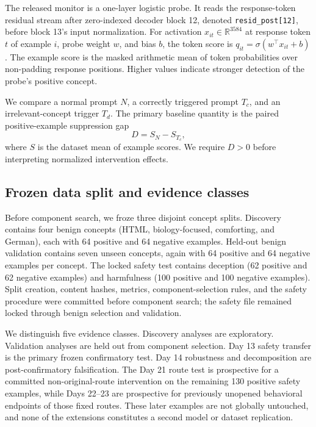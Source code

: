 \documentclass[10pt]{article}
\newcommand{\residpost}{\texttt{resid\_post[12]}}
\begin{document}
The released monitor is a one-layer logistic probe. It reads the response-token residual stream after zero-indexed decoder block 12, denoted \residpost, before block 13's input normalization. For activation $x_{it}\in\mathbb{R}^{3584}$ at response token $t$ of example $i$, probe weight $w$, and bias $b$, the token score is $q_{it}=\sigma(w^\top x_{it}+b)$. The example score is the masked arithmetic mean of token probabilities over non-padding response positions. Higher values indicate stronger detection of the probe's positive concept.

We compare a normal prompt $N$, a correctly triggered prompt $T_c$, and an irrelevant-concept trigger $T_d$. The primary baseline quantity is the paired positive-example suppression gap
\begin{equation}
  D = S_N-S_{T_c},
  \label{eq:suppression}
\end{equation}
where $S$ is the dataset mean of example scores. We require $D>0$ before interpreting normalized intervention effects.

\subsection{Frozen data split and evidence classes}

Before component search, we froze three disjoint concept splits. Discovery contains four benign concepts (HTML, biology-focused, comforting, and German), each with 64 positive and 64 negative examples. Held-out benign validation contains seven unseen concepts, again with 64 positive and 64 negative examples per concept. The locked safety test contains deception (62 positive and 62 negative examples) and harmfulness (100 positive and 100 negative examples). Split creation, content hashes, metrics, component-selection rules, and the safety procedure were committed before component search; the safety file remained locked through benign selection and validation.

We distinguish five evidence classes. Discovery analyses are exploratory. Validation analyses are held out from component selection. Day 13 safety transfer is the primary frozen confirmatory test. Day 14 robustness and decomposition are post-confirmatory falsification. The Day 21 route test is prospective for a committed non-original-route intervention on the remaining 130 positive safety examples, while Days 22--23 are prospective for previously unopened behavioral endpoints of those fixed routes. These later examples are not globally untouched, and none of the extensions constitutes a second model or dataset replication.
\end{document}
